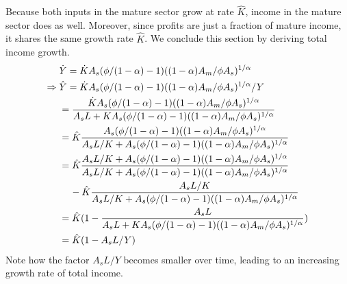 \documentclass[a4paper]{article}
\begin{document}
Because both inputs in the mature sector grow at rate $\hat{K}$, income in the mature sector does as well. Moreover, since profits are just a fraction of mature income, it shares the same growth rate $\hat{K}$. We conclude this section by deriving total income growth.
\begin{subequations}
\begin{align}
 &\dot{Y} =\dot{K}A_s(\phi/(1-\alpha)-1)((1-{\alpha})A_m/{\phi}A_s)^{1/{\alpha}}\\
 \Rightarrow \hspace{0.1cm} 
 &\hat{Y}	=\dot{K}A_s(\phi/(1-\alpha)-1)((1-{\alpha})A_m/{\phi}A_s)^{1/{\alpha}}/Y\nonumber\\
 &{}		=\frac{\dot{K}A_s(\phi/(1-\alpha)-1)((1-{\alpha})A_m/{\phi}A_s)^{1/{\alpha}}}{A_sL+KA_s({\phi/(1-\alpha)-1})((1-{\alpha})A_m/{\phi}A_s)^{1/\alpha}}\nonumber\\
 &{}		=\hat{K}\frac{A_s(\phi/(1-\alpha)-1)((1-{\alpha})A_m/{\phi}A_s)^{1/{\alpha}}}{A_sL/K+A_s({\phi/(1-\alpha)-1})((1-{\alpha})A_m/{\phi}A_s)^{1/\alpha}}\nonumber\\
 &{}		=\hat{K}\frac{A_sL/K+A_s(\phi/(1-\alpha)-1)((1-{\alpha})A_m/{\phi}A_s)^{1/{\alpha}}}{A_sL/K+A_s({\phi/(1-\alpha)-1})((1-{\alpha})A_m/{\phi}A_s)^{1/\alpha}}\nonumber\\
 &{}		\hspace{0.4cm}-\hat{K}\frac{A_sL/K}{A_sL/K+A_s({\phi/(1-\alpha)-1})((1-{\alpha})A_m/{\phi}A_s)^{1/\alpha}}\nonumber\\
 &{}		=\hat{K}(1-\frac{A_sL}{A_sL+KA_s({\phi/(1-\alpha)-1})((1-{\alpha})A_m/{\phi}A_s)^{1/\alpha}})\nonumber\\
  &{}		=\hat{K}(1-A_sL/Y)
\end{align}
\end{subequations}
Note how the factor $A_sL/Y$ becomes smaller over time, leading to an increasing growth rate of total income.
\newpage
\end{document}
